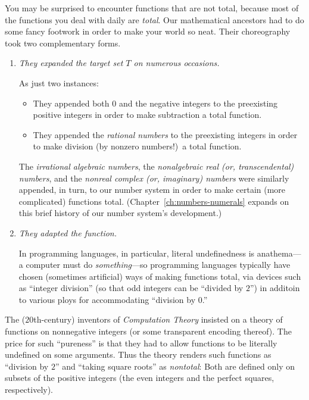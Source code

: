 
\medskip

You may be surprised to encounter functions that are not total, because most of the functions you deal with daily are {\em total}.  Our mathematical ancestors had to do some fancy footwork in order to make your world so neat.  Their choreography took two complementary forms.
\begin{enumerate}
\item
{\em They expanded the target set $T$ on numerous occasions.}

\smallskip

As just two instances:
  \begin{itemize}
  \item
They appended both $0$ and the negative integers to the preexisting positive integers in order to make subtraction a total function.

  \item
They appended the {\it rational numbers} to the preexisting integers in order to make division (by nonzero numbers!)~a total function.
  \end{itemize}
The {\it irrational algebraic numbers}, the {\it nonalgebraic real (or, transcendental) numbers}, and the {\it nonreal complex (or, imaginary) numbers} were similarly appended, in turn, to our number system in order to make certain (more complicated) functions total.  (Chapter~\ref{ch:numbers-numerals} expands on this brief history of our number system's development.)

\item
{\em They adapted the function.}

\smallskip

In programming languages, in particular, literal undefinedness is anathema---a computer must do {\em something}---so programming languages typically have chosen (sometimes artificial) ways of making functions total, via devices such as ``integer division'' (so that odd integers can be ``divided by $2$'') in additoin to various ploys for accommodating ``division by $0$.''
\end{enumerate}
The ($20$th-century) inventors of {\em Computation Theory} insisted on a theory of functions on nonnegative integers (or some transparent encoding thereof).  The price for such ``pureness'' is that they had to allow functions to be literally undefined on some arguments.  Thus the theory renders such functions as ``division by $2$'' and ``taking square roots'' as {\em nontotal}: Both are defined only on subsets of the positive integers (the even integers and the perfect squares, respectively).

